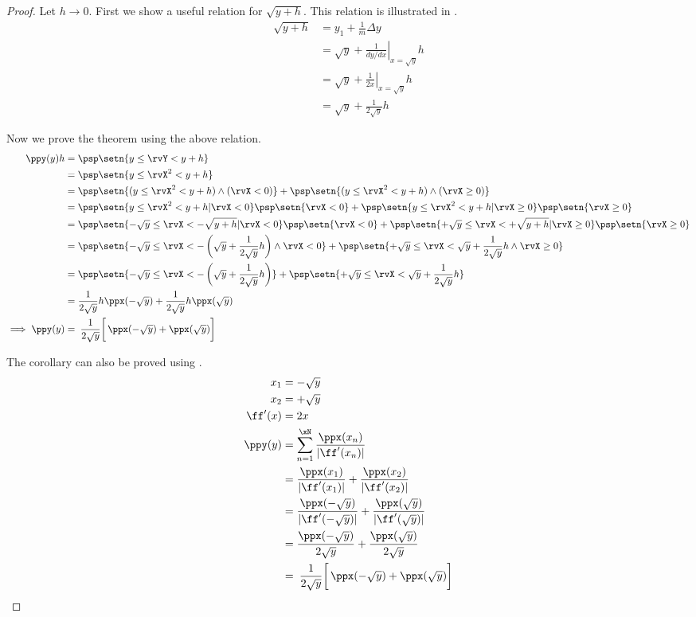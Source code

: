 \begin{proof}
Let $h\to0$.
First we show a useful relation for $\sqrt{y+h}$.
This relation is illustrated in .
\begin{align*}
  \sqrt{y+h}
    &=    y_1 + \frac{1}{m} \Delta y
  \\&=    \sqrt{y} + \left.\frac{1}{dy/dx}\right|_{x=\sqrt{y}} h
  \\&=    \sqrt{y} + \left.\frac{1}{2x}\right|_{x=\sqrt{y}} h
  \\&=    \sqrt{y} + \frac{1}{2\sqrt{y}} h
\end{align*}

Now we prove the theorem using the above relation.
\begin{align*}
  \ppy(y)h
    &= \psp\setn{y\le\rvY < y+h}
  \\&= \psp\setn{y\le\rvX^2 < y+h}
  \\&= \psp\setn{(y\le\rvX^2 < y+h) \land (\rvX<0)}+ \psp\setn{(y\le\rvX^2 < y+h) \land (\rvX\ge0)}
  \\&= \psp\setn{y\le\rvX^2 < y+h |\rvX<0}\psp\setn{\rvX<0} + \psp\setn{y\le\rvX^2 < y+h |\rvX\ge0}\psp\setn{\rvX\ge0}
  \\&= \psp\setn{-\sqrt{y}\le\rvX < -\sqrt{y+h} |\rvX<0  } \psp\setn{\rvX<0} +
       \psp\setn{+\sqrt{y}\le\rvX < +\sqrt{y+h} |\rvX\ge0} \psp\setn{\rvX\ge0}
  \\&= \psp\setn{-\sqrt{y}\le\rvX < -\left(\sqrt{y}+\frac{1}{2\sqrt{y}}h\right) \land\rvX<0   } +
       \psp\setn{+\sqrt{y}\le\rvX <        \sqrt{y}+\frac{1}{2\sqrt{y}}h        \land\rvX\ge0 }
  \\&= \psp\setn{-\sqrt{y}\le\rvX < -\left(\sqrt{y}+\frac{1}{2\sqrt{y}}h\right)  } +
       \psp\setn{+\sqrt{y}\le\rvX <        \sqrt{y}+\frac{1}{2\sqrt{y}}h         }
  \\&= \frac{1}{2\sqrt{y}}h\ppx(-\sqrt{y})  +
       \frac{1}{2\sqrt{y}}h\ppx( \sqrt{y})
\\\implies
  \ppy(y)
    &=  \left.\left.\frac{1}{2\sqrt{y}}\right[
        \ppx(-\sqrt{y}) + \ppx( \sqrt{y}) \right]
\end{align*}

The corollary can also be proved using .
\begin{align*}
  x_1 &= -\sqrt{y} \\
  x_2 &= +\sqrt{y} \\
  \ff'(x) &= 2x    \\
  \ppy(y)
    &= \sum_{n=1}^{\xN} \frac{\ppx(x_n)}{|\ff'(x_n)|}
  \\&= \frac{\ppx(x_1)}{|\ff'(x_1)|} + \frac{\ppx(x_2)}{|\ff'(x_2)|}
  \\&= \frac{\ppx(-\sqrt{y})}{|\ff'(-\sqrt{y})|} + \frac{\ppx(\sqrt{y})}{|\ff'(\sqrt{y})|}
  \\&= \frac{\ppx(-\sqrt{y})}{2\sqrt{y}} + \frac{\ppx(\sqrt{y})}{2\sqrt{y}}
  \\&=    \left.\left.\frac{1}{2\sqrt{y}}\right[
          \ppx(-\sqrt{y}) + \ppx( \sqrt{y}) \right]
\end{align*}
\end{proof}


